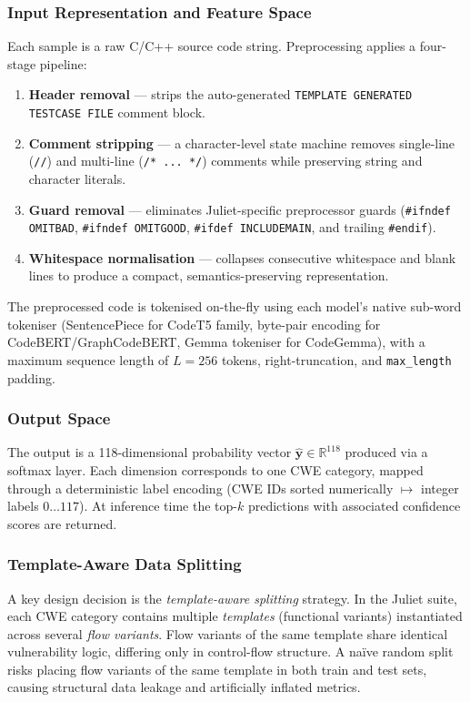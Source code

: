 \documentclass[conference]{IEEEtran}
\begin{document}
\subsubsection{Input Representation and Feature Space}
Each sample is a raw C/C++ source code string.  Preprocessing applies a
four-stage pipeline:
\begin{enumerate}
    \item \textbf{Header removal} --- strips the auto-generated
          \texttt{TEMPLATE GENERATED TESTCASE FILE} comment block.
    \item \textbf{Comment stripping} --- a character-level state machine
          removes single-line (\texttt{//}) and multi-line
          (\texttt{/* ... */}) comments while preserving string and
          character literals.
    \item \textbf{Guard removal} --- eliminates Juliet-specific preprocessor
          guards (\texttt{\#ifndef OMITBAD}, \texttt{\#ifndef OMITGOOD},
          \texttt{\#ifdef INCLUDEMAIN}, and trailing \texttt{\#endif}).
    \item \textbf{Whitespace normalisation} --- collapses consecutive
          whitespace and blank lines to produce a compact, semantics-preserving
          representation.
\end{enumerate}
The preprocessed code is tokenised on-the-fly using each model's native
sub-word tokeniser (SentencePiece for CodeT5 family, byte-pair encoding for
CodeBERT/GraphCodeBERT, Gemma tokeniser for CodeGemma), with a maximum
sequence length of $L = 256$ tokens, right-truncation, and
\texttt{max\_length} padding.

\subsubsection{Output Space}
The output is a 118-dimensional probability vector $\hat{\mathbf{y}} \in
\mathbb{R}^{118}$ produced via a softmax layer.  Each dimension corresponds
to one CWE category, mapped through a deterministic label encoding (CWE IDs
sorted numerically $\mapsto$ integer labels $0 \ldots 117$).  At inference
time the top-$k$ predictions with associated confidence scores are returned.

\subsubsection{Template-Aware Data Splitting}
A key design decision is the \emph{template-aware splitting} strategy.  In
the Juliet suite, each CWE category contains multiple \emph{templates}
(functional variants) instantiated across several \emph{flow variants}.
Flow variants of the same template share identical vulnerability logic,
differing only in control-flow structure.  A na\"ive random split risks
placing flow variants of the same template in both train and test sets,
causing structural data leakage and artificially inflated metrics.
\end{document}
